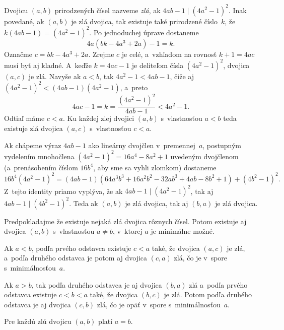 {%
Dvojicu $(a,b)$ prirodzených čísel nazveme {\it zlá}, ak $4ab-1\mid(4a^2-1)^2$. Inak povedané, ak $(a,b)$ je zlá dvojica, tak existuje také prirodzené číslo~$k$, že $k(4ab-1)=(4a^2-1)^2$. Po jednoduchej úprave dostaneme
$$
4a(bk-4a^3+2a)-1=k.
$$
Označme $c=bk-4a^3+2a$. Zrejme $c$ je celé, a~vzhľadom na rovnosť $k+1=4ac$ musí byť aj kladné. A~keďže $k=4ac-1$ je deliteľom čísla $(4a^2-1)^2$, dvojica $(a,c)$ je zlá. Navyše ak $a<b$, tak $4a^2-1<4ab-1$, čiže aj $(4a^2-1)^2<(4ab-1)(4a^2-1)$, a~preto
$$
4ac-1=k=\frac{(4a^2-1)^2}{4ab-1}<4a^2-1.
$$
Odtiaľ máme $c<a$. Ku každej zlej dvojici $(a,b)$ s~vlastnosťou $a<b$ teda existuje zlá dvojica $(a,c)$ s~vlastnosťou $c<a$.

\smallskip
Ak chápeme výraz $4ab-1$ ako lineárny dvojčlen v~premennej~$a$, postupným vydelením mnohočlena $(4a^2-1)^2=16a^4-8a^2+1$ uvedeným dvojčlenom (a~prenásobením číslom $16b^4$, aby sme sa vyhli zlomkom) dostaneme
$$
16b^4(4a^2-1)^2=(4ab-1)(64a^3b^3+16a^2b^2-32ab^3+4ab-8b^2+1)+(4b^2-1)^2.
$$
Z~tejto identity priamo vyplýva, že ak $4ab-1\mid(4a^2-1)^2$, tak aj $4ab-1\mid(4b^2-1)^2$. Teda ak $(a,b)$ je zlá dvojica, tak aj $(b,a)$ je zlá dvojica.

\smallskip
Predpokladajme že existuje nejaká zlá dvojica rôznych čísel. Potom existuje aj dvojica $(a,b)$ s~vlastnosťou $a\ne b$, v~ktorej $a$ je minimálne možné.

Ak $a<b$, podľa prvého odstavca existuje $c<a$ také, že dvojica $(a,c)$ je zlá, a~podľa druhého odstavca je potom aj dvojica $(c,a)$ zlá, čo je v~spore s~minimálnosťou~$a$.

Ak $a>b$, tak podľa druhého odstavca je aj dvojica $(b,a)$ zlá a~podľa prvého odstavca existuje $c<b<a$ také, že dvojica $(b,c)$ je zlá. Potom podľa druhého odstavca je aj dvojica $(c,b)$ zlá, čo je opäť v~spore s~minimálnosťou~$a$.

\zaver
Pre každú zlú dvojicu $(a,b)$ platí $a=b$.
}

